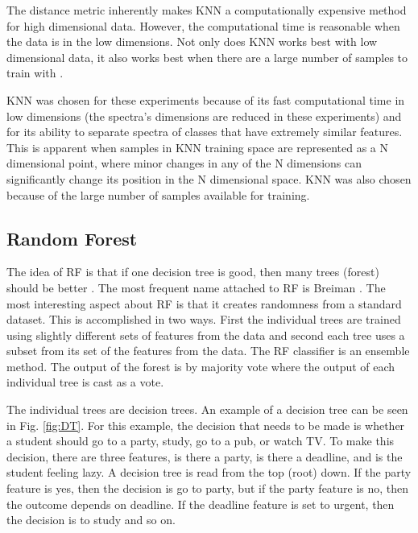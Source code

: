 \documentclass[./AutomatedMK.tex]{subfiles}
\begin{document}
\noindent The distance metric inherently makes KNN a computationally expensive method for high dimensional data. However, the computational time is reasonable when the data is in the low dimensions. Not only does KNN works best with low dimensional data, it also works best when there are a large number of samples to train with \citep{Marsland, VanderPlas}.

KNN was chosen for these experiments because of its fast computational time in low dimensions (the spectra's dimensions are reduced in these experiments) and for its ability to separate spectra of classes that have extremely similar features. This is apparent when samples in KNN training space are represented as a N dimensional point, where minor changes in any of the N dimensions can significantly change its position in the N dimensional space. KNN was also chosen because of the large number of samples available for training.

\subsection{Random Forest}

The idea of RF is that if one decision tree is good, then many trees (forest) should be better \citep{Marsland}. The most frequent name attached to RF  is Breiman \citep{Marsland}. The most interesting aspect about RF is that it creates randomness from a standard dataset. This is accomplished in two ways. First the individual trees are trained using slightly different sets of features from the data and second each tree uses a subset from its set of the features from the data. The RF classifier is an ensemble method. The output of the forest is by majority vote where the output of each individual tree is cast as a vote. 

The individual trees are decision trees. An example of a decision tree can be seen in Fig. \ref{fig:DT}. For this example, the decision that needs to be made is whether a student should go to a party, study, go to a pub, or watch TV. To make this decision, there are three features, is there a party, is there a deadline, and is the student feeling lazy. A decision tree is read from the top (root) down. If the party feature is yes, then the decision is go to party, but if the party feature is no, then the outcome depends on deadline. If the deadline feature is set to urgent, then the decision is to study and so on. 
\end{document}
